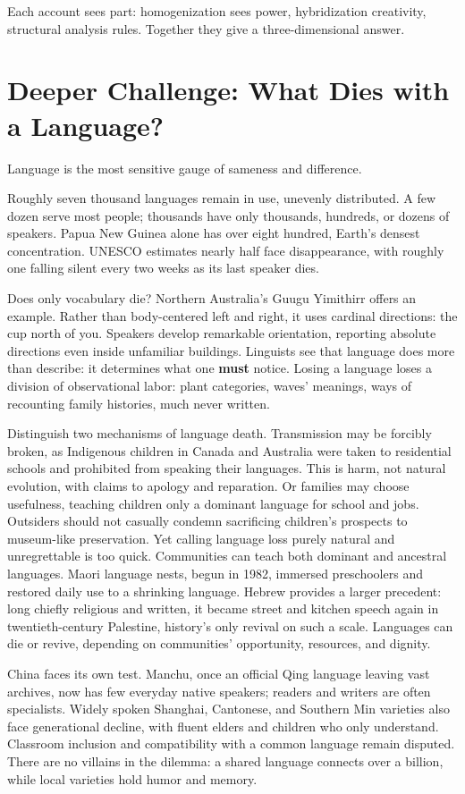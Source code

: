 Each account sees part: homogenization sees power, hybridization creativity, structural analysis rules. Together they give a three-dimensional answer.

\section[What Dies with a Language?]{Deeper Challenge: What Dies with a Language?}
Language is the most sensitive gauge of sameness and difference.

Roughly seven thousand languages remain in use, unevenly distributed. A few dozen serve most people; thousands have only thousands, hundreds, or dozens of speakers. Papua New Guinea alone has over eight hundred, Earth's densest concentration. UNESCO estimates nearly half face disappearance, with roughly one falling silent every two weeks as its last speaker dies.

Does only vocabulary die? Northern Australia's Guugu Yimithirr offers an example. Rather than body-centered left and right, it uses cardinal directions: the cup north of you. Speakers develop remarkable orientation, reporting absolute directions even inside unfamiliar buildings. Linguists see that language does more than describe: it determines what one \textbf{must} notice. Losing a language loses a division of observational labor: plant categories, waves' meanings, ways of recounting family histories, much never written.

Distinguish two mechanisms of language death. Transmission may be forcibly broken, as Indigenous children in Canada and Australia were taken to residential schools and prohibited from speaking their languages. This is harm, not natural evolution, with claims to apology and reparation. Or families may choose usefulness, teaching children only a dominant language for school and jobs. Outsiders should not casually condemn sacrificing children's prospects to museum-like preservation. Yet calling language loss purely natural and unregrettable is too quick. Communities can teach both dominant and ancestral languages. Maori language nests, begun in 1982, immersed preschoolers and restored daily use to a shrinking language. Hebrew provides a larger precedent: long chiefly religious and written, it became street and kitchen speech again in twentieth-century Palestine, history's only revival on such a scale. Languages can die or revive, depending on communities' opportunity, resources, and dignity.

China faces its own test. Manchu, once an official Qing language leaving vast archives, now has few everyday native speakers; readers and writers are often specialists. Widely spoken Shanghai, Cantonese, and Southern Min varieties also face generational decline, with fluent elders and children who only understand. Classroom inclusion and compatibility with a common language remain disputed. There are no villains in the dilemma: a shared language connects over a billion, while local varieties hold humor and memory.

